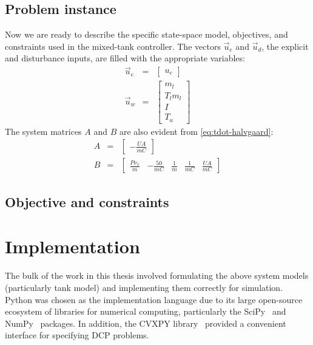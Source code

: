 \subsection{Problem instance}

Now we are ready to describe the specific state-space model, objectives, and constraints used in the mixed-tank controller.
The vectors $\vec{u}_e$ and $\vec{u}_d$, the explicit and disturbance inputs, are filled with the appropriate variables:
\begin{eqnarray}
   \vec{u}_e &=& \left[\begin{array}{c}
		u_e
	\end{array} \right]
	\\
   \vec{u}_w &=& \left[\begin{array}{cccc}
		m_l \\ T_l m_l \\ I \\ T_a
	\end{array} \right]
\end{eqnarray}
The system matrices $A$ and $B$ are also evident from \autoref{eq:tdot-halvgaard}:
\begin{eqnarray}
	A &=& \left[\begin{array}{c}
		-\frac{UA}{mC}
	\end{array} \right]
	\\
	B &=& \left[\begin{array}{ccccc}
		\frac{P \nu_x}{m} &
		-\frac{50}{mC} &
		\frac{1}{m} &
		\frac{1}{mC} &
		\frac{UA}{mC}
	\end{array} \right]
\end{eqnarray}

\subsection{Objective and constraints}



\section{Implementation}

The bulk of the work in this thesis involved formulating the above system models (particularly tank model) and implementing them correctly for simulation.
Python was chosen as the implementation language due to its large open-source ecosystem of libraries for numerical computing, particularly the SciPy~\cite{SCIPY} and NumPy~\cite{Walt11} packages.
In addition, the CVXPY library~\cite{CVXPY} provided a convenient interface for specifying DCP problems.

